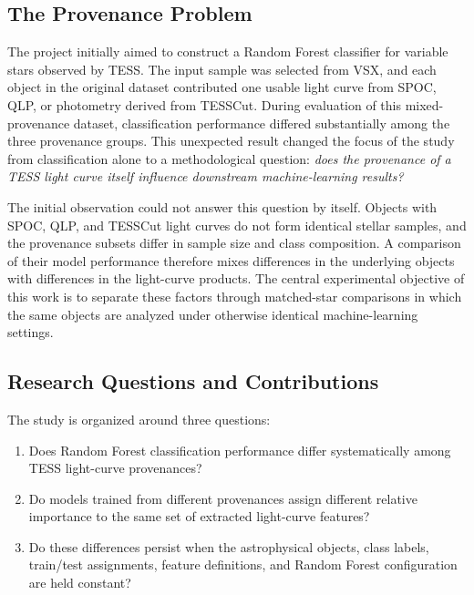 \documentclass[linenumbers]{aastex701}
\begin{document}

\subsection{The Provenance Problem}
The project initially aimed to construct a Random Forest classifier for variable stars observed by TESS. The input sample was selected from VSX, and each object in the original dataset contributed one usable light curve from SPOC, QLP, or photometry derived from TESSCut. During evaluation of this mixed-provenance dataset, classification performance differed substantially among the three provenance groups. This unexpected result changed the focus of the study from classification alone to a methodological question: \emph{does the provenance of a TESS light curve itself influence downstream machine-learning results?}

The initial observation could not answer this question by itself. Objects with SPOC, QLP, and TESSCut light curves do not form identical stellar samples, and the provenance subsets differ in sample size and class composition. A comparison of their model performance therefore mixes differences in the underlying objects with differences in the light-curve products. The central experimental objective of this work is to separate these factors through matched-star comparisons in which the same objects are analyzed under otherwise identical machine-learning settings.

\subsection{Research Questions and Contributions}
The study is organized around three questions:
\begin{enumerate}
\item Does Random Forest classification performance differ systematically among TESS light-curve provenances?
\item Do models trained from different provenances assign different relative importance to the same set of extracted light-curve features?
\item Do these differences persist when the astrophysical objects, class labels, train/test assignments, feature definitions, and Random Forest configuration are held constant?
\end{enumerate}
\end{document}
